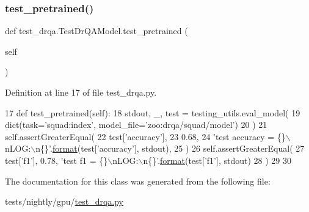 \subsubsection{\texorpdfstring{test\+\_\+pretrained()}{test\_pretrained()}}
{\footnotesize\ttfamily def test\+\_\+drqa.\+Test\+Dr\+Q\+A\+Model.\+test\+\_\+pretrained (\begin{DoxyParamCaption}\item[{}]{self }\end{DoxyParamCaption})}



Definition at line 17 of file test\+\_\+drqa.\+py.


\begin{DoxyCode}
17     \textcolor{keyword}{def }test\_pretrained(self):
18         stdout, \_, test = testing\_utils.eval\_model(
19             dict(task=\textcolor{stringliteral}{'squad:index'}, model\_file=\textcolor{stringliteral}{'zoo:drqa/squad/model'})
20         )
21         self.assertGreaterEqual(
22             test[\textcolor{stringliteral}{'accuracy'}],
23             0.68,
24             \textcolor{stringliteral}{'test accuracy = \{\}\(\backslash\)nLOG:\(\backslash\)n\{\}'}.\hyperlink{namespaceparlai_1_1chat__service_1_1services_1_1messenger_1_1shared__utils_a32e2e2022b824fbaf80c747160b52a76}{format}(test[\textcolor{stringliteral}{'accuracy'}], stdout),
25         )
26         self.assertGreaterEqual(
27             test[\textcolor{stringliteral}{'f1'}], 0.78, \textcolor{stringliteral}{'test f1 = \{\}\(\backslash\)nLOG:\(\backslash\)n\{\}'}.\hyperlink{namespaceparlai_1_1chat__service_1_1services_1_1messenger_1_1shared__utils_a32e2e2022b824fbaf80c747160b52a76}{format}(test[\textcolor{stringliteral}{'f1'}], stdout)
28         )
29 
30 
\end{DoxyCode}


The documentation for this class was generated from the following file\+:\begin{DoxyCompactItemize}
\item 
tests/nightly/gpu/\hyperlink{test__drqa_8py}{test\+\_\+drqa.\+py}\end{DoxyCompactItemize}
